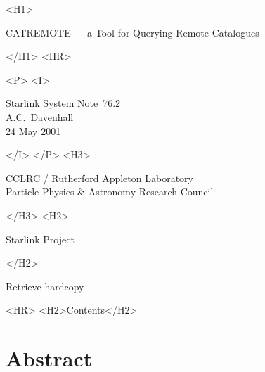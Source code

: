 \documentclass[twoside,11pt]{article}
\newcommand{\stardoccategory}  {Starlink System Note}
\newcommand{\stardocsource}    {ssn\stardocnumber}
\newcommand{\stardocnumber}    {76.2}
\newcommand{\stardocauthors}   {A.C.~Davenhall}
\newcommand{\stardocdate}      {24 May 2001}
\newcommand{\stardoctitle}     {CATREMOTE --- a Tool for Querying Remote
Catalogues}
\newcommand{\htmladdnormallink}[2]{#1}
\newcommand{\htmladdimg}[1]{}
\newcommand{\htmlref}[2]{#1}
\newcommand{\htmladdtonavigation}[1]{}
\newcommand{\xlabel}[1]{}
\renewcommand{\_}{\texttt{\symbol{95}}}
\begin{document}
\begin{htmlonly}
   \xlabel{}
   \begin{rawhtml} <H1> \end{rawhtml}
      \stardoctitle
   \begin{rawhtml} </H1> <HR> \end{rawhtml}

   \begin{rawhtml} <P> <I> \end{rawhtml}
   \stardoccategory\ \stardocnumber \\
   \stardocauthors \\
   \stardocdate
   \begin{rawhtml} </I> </P> <H3> \end{rawhtml}
      \htmladdnormallink{CCLRC / Rutherford Appleton Laboratory}
                        {http://www.cclrc.ac.uk} \\
      \htmladdnormallink{Particle Physics \& Astronomy Research Council}
                        {http://www.pparc.ac.uk} \\
   \begin{rawhtml} </H3> <H2> \end{rawhtml}
      \htmladdnormallink{Starlink Project}{http://www.starlink.rl.ac.uk/}
   \begin{rawhtml} </H2> \end{rawhtml}
   \htmladdnormallink{\htmladdimg{source.gif} Retrieve hardcopy}
      {http://www.starlink.rl.ac.uk/cgi-bin/hcserver?\stardocsource}\\

  \label{stardoccontents}
  \begin{rawhtml} 
    <HR>
    <H2>Contents</H2>
  \end{rawhtml}
  \htmladdtonavigation{\htmlref{\htmladdimg{contents_motif.gif}}
        {stardoccontents}}

  \section{\xlabel{abstract}Abstract}

\end{htmlonly}
\end{document}
